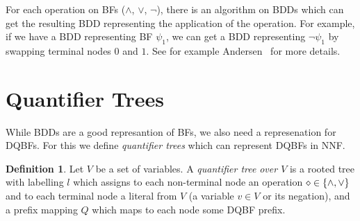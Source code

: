 \documentclass[
  digital, %
  color,
  twoside, %
  table,   %
  nolof,     %
  nolot,     %
]{fithesis3}
\let\setbuilder\set
\newcommand{\simpleset}[1]{\{{#1}\}}
\renewcommand{\set}[1]{\normalexpandarg\IfSubStr{#1}{|}{\setbuilder{#1}}{\simpleset{#1}}}
\theoremstyle{definition}
\newtheorem{definition}{Definition}
\newtheorem{example}{Example}
\theoremstyle{remark}
\begin{document}



For each operation on BFs (${\land}$, ${\lor}$, ${\neg}$), there is an algorithm on BDDs which can get the resulting BDD representing the application of the operation. For example, if we have a BDD representing BF $\psi_1$, we can get a BDD representing $\neg \psi_1$ by swapping terminal nodes $0$ and $1$. See for example Andersen~\cite{BDDdetails} for more details. %



\section{Quantifier Trees}
\label{sec:QT}
While BDDs are a good represantion of BFs, we also need a represenation for DQBFs. For this we define \emph{quantifier trees} which can represent DQBFs in NNF.

\begin{definition}
  Let $V$ be a set of variables. A \emph{quantifier tree} \emph{over $V$} is a rooted tree with labelling $l$ which assigns to each non-terminal node an operation ${\diamond} \in \set{{\land},{\lor}}$ and to each terminal node a literal from $V$ (a variable $v \in V$ or its negation), and a prefix mapping $Q$ which maps to each node some DQBF prefix.
\end{definition}
\end{document}

